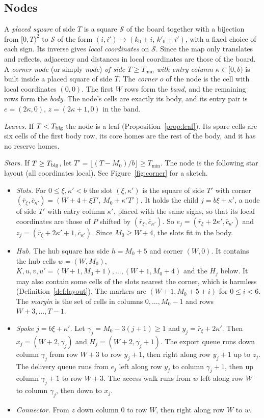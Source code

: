 \documentclass[11pt]{amsart}
\theoremstyle{definition}
\begin{document}
\subsection{Nodes}
A \emph{placed square} of side $T$ is a square $\mathcal S$ of the board together with a bijection from $[0,T)^2$ to $\mathcal S$
of the form $(i,i')\mapsto(k_0\pm i,\,k'_0\pm i')$, with a fixed choice of each sign. Its inverse gives \emph{local coordinates}
on $\mathcal S$. Since the map only translates and reflects, adjacency and distances in local coordinates are those of the board.
A \emph{corner node} (or simply \emph{node}) \emph{of side $T\ge T_{\min}$ with entry column $\kappa\in[0,b)$} is built inside a placed
square of side $T$. The
\emph{corner} $o$ of the node is the cell with local coordinates $(0,0)$. The first $W$ rows form the
\emph{band}, and the remaining rows form the \emph{body}. The node's cells are exactly its body, and its
entry pair is $e=(2\kappa,0)$, $z=(2\kappa+1,0)$ in the band.

\emph{Leaves.} If $T<T_{\rm big}$ the node is a leaf (Proposition~\ref{prop:leaf}). Its spare cells are
six cells of the first body row, its core homes are the rest of the body, and it has no reserve homes.

\emph{Stars.} If $T\ge T_{\rm big}$, let $T'=\lfloor (T-M_0)/b\rfloor\ge T_{\min}$. The node is the following star layout
(all coordinates local). See Figure~\ref{fig:corner} for a sketch.
\begin{itemize}[nosep]
\item \emph{Slots.} For $0\le\xi,\kappa'<b$ the slot $(\xi,\kappa')$ is the square of side $T'$ with corner
  $(\bar r_\xi,\bar c_{\kappa'})=(W+4+\xi T',\,M_0+\kappa'T')$. It holds the child $j=b\xi+\kappa'$, a node of side $T'$
  with entry column $\kappa'$, placed with the same signs, so that its local coordinates are those of $P$ shifted by
  $(\bar r_\xi,\bar c_{\kappa'})$. So $e_j=(\bar r_\xi+2\kappa',\bar c_{\kappa'})$ and
  $z_j=(\bar r_\xi+2\kappa'+1,\bar c_{\kappa'})$. Since $M_0\ge W+4$, the slots fit in the body.
\item \emph{Hub.} The hub square has side $h=M_0+5$ and corner $(W,0)$. It contains the hub cells $w=(W,M_0)$,
  $K,u,v,u'=(W+1,M_0+1),\dots,(W+1,M_0+4)$ and the $H_j$ below. It may also contain some cells of the slots
  nearest the corner, which is harmless (Definition~\ref{def:layout}). The markers are $(W+1,M_0+5+i)$ for $0\le i<6$.
  The \emph{margin} is the set of cells in columns $0,\dots,M_0-1$ and rows $W+3,\dots,T-1$.
\item \emph{Spoke $j=b\xi+\kappa'$.} Let $\gamma_j=M_0-3(j+1)\ge1$ and $y_j=\bar r_\xi+2\kappa'$. Then
  $x_j=(W+2,\gamma_j)$ and $H_j=(W+2,\gamma_j+1)$. The export queue runs down column $\gamma_j$ from row $W+3$ to row
  $y_j+1$, then right along row $y_j+1$ up to $z_j$. The delivery queue runs from $e_j$ left along row
  $y_j$ to column $\gamma_j+1$, then up column $\gamma_j+1$ to row $W+3$. The access walk runs from $w$ left along row
  $W$ to column $\gamma_j$, then down to $x_j$.
\item \emph{Connector.} From $z$ down column $0$ to row $W$, then right along row $W$ to $w$.
\end{itemize}
\end{document}
